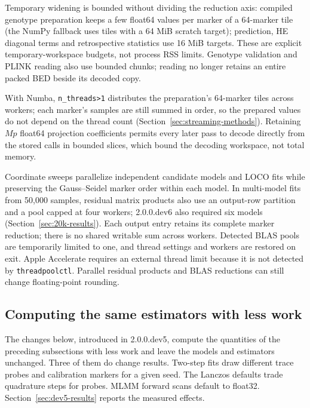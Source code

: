 \documentclass[11pt]{article}
\newcommand{\code}[1]{\texttt{#1}}
\begin{document}
Temporary widening is bounded without dividing the reduction axis:
compiled genotype preparation keeps a few float64 values per marker of a
64-marker tile (the NumPy fallback uses tiles with a 64 MiB scratch
target); prediction, HE diagonal terms and retrospective statistics use
16 MiB targets. These are explicit temporary-workspace budgets, not process RSS
limits. Genotype validation and PLINK reading also use bounded chunks;
reading no longer retains an entire packed BED beside its decoded copy.

With Numba, \code{n\_threads>1} distributes the preparation's 64-marker
tiles across workers; each marker's samples are still summed in order, so
the prepared values do not depend on the thread count
(Section~\ref{sec:streaming-methods}). Retaining $Mp$ float64 projection
coefficients permits every later pass to decode directly from the stored
calls in bounded slices, which bound the decoding workspace, not total
memory.

Coordinate sweeps parallelize independent candidate models and LOCO
fits while preserving the Gauss--Seidel marker order within each model.
In multi-model fits from 50,000 samples, residual matrix products also
use an output-row partition and a pool capped at four workers; 2.0.0.dev6
also required six models (Section~\ref{sec:20k-results}). Each output
entry retains its complete marker reduction; there is no shared writable
sum across workers. Detected BLAS pools are temporarily limited to one,
and thread settings and workers are restored on exit. Apple Accelerate
requires an external thread limit because it is not detected by
\code{threadpoolctl}. Parallel residual products and BLAS reductions can
still change floating-point rounding.

\subsection{Computing the same estimators with less work}
\label{sec:dev5-methods}

The changes below, introduced in 2.0.0.dev5, compute the quantities of the
preceding subsections with less work and leave the models and estimators
unchanged. Three of them do change results. Two-step fits draw different trace probes and calibration
markers for a given seed. The Lanczos defaults trade quadrature steps for
probes. MLMM forward scans default to float32.
Section~\ref{sec:dev5-results} reports the measured effects.
\end{document}
